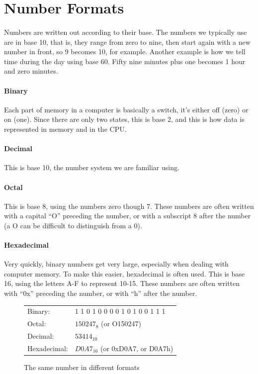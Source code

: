 \documentclass[letter,11pt]{article}
\begin{document}
\FloatBarrier
\section{Number Formats}
\paragraph{}Numbers are written out according to their base. The numbers we typically use are in base 10, that is, they range from zero to nine, then start again with a new number in front, so 9 becomes 10, for example. Another example is how we tell time during the day using base 60. Fifty nine minutes plus one becomes 1 hour and zero minutes.

\paragraph{Binary}Each part of memory in a computer is basically a switch, it's either off (zero) or on (one). Since there are only two states, this is base 2, and this is how data is represented in memory and in the CPU.

\paragraph{Decimal}This is base 10, the number system we are familiar using.

\paragraph{Octal}This is base 8, using the numbers zero though 7. These numbers are often written with a capital ``O'' preceding the number, or with a subscript 8 after the number (a O can be difficult to distinguish from a 0).

\paragraph{Hexadecimal}Very quickly, binary numbers get very large, especially when dealing with computer memory. To make this easier, hexadecimal is often used. This is base 16, using the letters A-F to represent 10-15. These numbers are often written with ``0x'' preceding the number, or with ``h'' after the number.

\begin{figure}[h!]
    \centering
    \begin{tabular}{l l}
         Binary:      & 1 1 0 1 0 0 0 0 1 0 1 0 0 1 1 1  \\
         Octal:       & $150247_8$ (or O150247) \\
         Decimal:     & $53414_{10}$ \\
         Hexadecimal: & $D0A7_{16}$ (or 0xD0A7, or D0A7h)
    \end{tabular}
    \caption{The same number in different formats}
    \label{fig:datatypesequivalent}
\end{figure}
\end{document}
